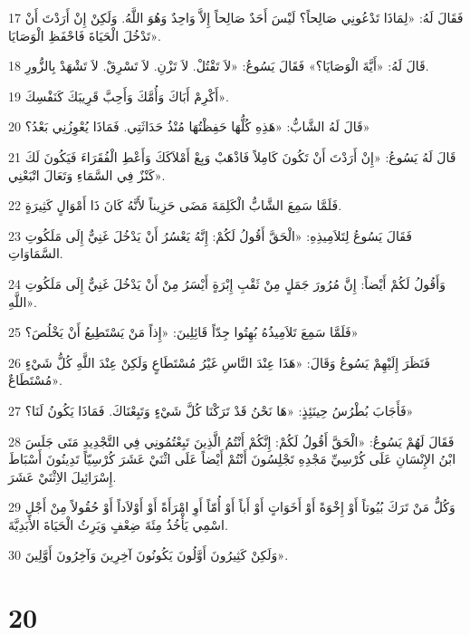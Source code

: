 \par 17 فَقَالَ لَهُ: «لِمَاذَا تَدْعُونِي صَالِحاً؟ لَيْسَ أَحَدٌ صَالِحاً إِلاَّ وَاحِدٌ وَهُوَ اللَّهُ. وَلَكِنْ إِنْ أَرَدْتَ أَنْ تَدْخُلَ الْحَيَاةَ فَاحْفَظِ الْوَصَايَا».
\par 18 قَالَ لَهُ: «أَيَّةَ الْوَصَايَا؟» فَقَالَ يَسُوعُ: «لاَ تَقْتُلْ. لاَ تَزْنِ. لاَ تَسْرِقْ. لاَ تَشْهَدْ بِالزُّورِ.
\par 19 أَكْرِمْ أَبَاكَ وَأُمَّكَ وَأَحِبَّ قَرِيبَكَ كَنَفْسِكَ».
\par 20 قَالَ لَهُ الشَّابُّ: «هَذِهِ كُلُّهَا حَفِظْتُهَا مُنْذُ حَدَاثَتِي. فَمَاذَا يُعْوِزُنِي بَعْدُ؟»
\par 21 قَالَ لَهُ يَسُوعُ: «إِنْ أَرَدْتَ أَنْ تَكُونَ كَامِلاً فَاذْهَبْ وَبِعْ أَمْلاَكَكَ وَأَعْطِ الْفُقَرَاءَ فَيَكُونَ لَكَ كَنْزٌ فِي السَّمَاءِ وَتَعَالَ اتْبَعْنِي».
\par 22 فَلَمَّا سَمِعَ الشَّابُّ الْكَلِمَةَ مَضَى حَزِيناً لأَنَّهُ كَانَ ذَا أَمْوَالٍ كَثِيرَةٍ.
\par 23 فَقَالَ يَسُوعُ لِتَلاَمِيذِهِ: «الْحَقَّ أَقُولُ لَكُمْ: إِنَّهُ يَعْسُرُ أَنْ يَدْخُلَ غَنِيٌّ إِلَى مَلَكُوتِ السَّمَاوَاتِ.
\par 24 وَأَقُولُ لَكُمْ أَيْضاً: إِنَّ مُرُورَ جَمَلٍ مِنْ ثَقْبِ إِبْرَةٍ أَيْسَرُ مِنْ أَنْ يَدْخُلَ غَنِيٌّ إِلَى مَلَكُوتِ اللَّهِ».
\par 25 فَلَمَّا سَمِعَ تَلاَمِيذُهُ بُهِتُوا جِدّاً قَائِلِينَ: «إِذاً مَنْ يَسْتَطِيعُ أَنْ يَخْلُصَ؟»
\par 26 فَنَظَرَ إِلَيْهِمْ يَسُوعُ وَقَالَ: «هَذَا عِنْدَ النَّاسِ غَيْرُ مُسْتَطَاعٍ وَلَكِنْ عِنْدَ اللَّهِ كُلُّ شَيْءٍ مُسْتَطَاعٌ».
\par 27 فَأَجَابَ بُطْرُسُ حِينَئِذٍ: «هَا نَحْنُ قَدْ تَرَكْنَا كُلَّ شَيْءٍ وَتَبِعْنَاكَ. فَمَاذَا يَكُونُ لَنَا؟»
\par 28 فَقَالَ لَهُمْ يَسُوعُ: «الْحَقَّ أَقُولُ لَكُمْ: إِنَّكُمْ أَنْتُمُ الَّذِينَ تَبِعْتُمُونِي فِي التَّجْدِيدِ مَتَى جَلَسَ ابْنُ الإِنْسَانِ عَلَى كُرْسِيِّ مَجْدِهِ تَجْلِسُونَ أَنْتُمْ أَيْضاً عَلَى اثْنَيْ عَشَرَ كُرْسِيّاً تَدِينُونَ أَسْبَاطَ إِسْرَائِيلَ الاِثْنَيْ عَشَرَ.
\par 29 وَكُلُّ مَنْ تَرَكَ بُيُوتاً أَوْ إِخْوَةً أَوْ أَخَوَاتٍ أَوْ أَباً أَوْ أُمّاً أَوِ امْرَأَةً أَوْ أَوْلاَداً أَوْ حُقُولاً مِنْ أَجْلِ اسْمِي يَأْخُذُ مِئَةَ ضِعْفٍ وَيَرِثُ الْحَيَاةَ الأَبَدِيَّةَ.
\par 30 وَلَكِنْ كَثِيرُونَ أَوَّلُونَ يَكُونُونَ آخِرِينَ وَآخِرُونَ أَوَّلِينَ».

\chapter{20}

